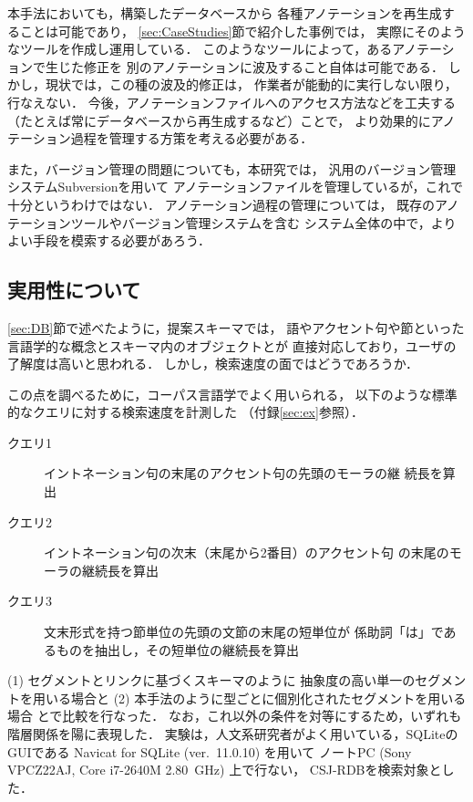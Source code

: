 \documentclass[japanese]{jnlp_1.4}
\begin{document}
本手法においても，構築したデータベースから
各種アノテーションを再生成することは可能であり，
\ref{sec:CaseStudies}節で紹介した事例では，
実際にそのようなツールを作成し運用している．
このようなツールによって，あるアノテーションで生じた修正を
別のアノテーションに波及すること自体は可能である．
しかし，現状では，この種の波及的修正は，
作業者が能動的に実行しない限り，行なえない．
今後，アノテーションファイルへのアクセス方法などを工夫する
（たとえば常にデータベースから再生成するなど）ことで，
より効果的にアノテーション過程を管理する方策を考える必要がある．

また，バージョン管理の問題についても，本研究では，
汎用のバージョン管理システムSubversionを用いて
アノテーションファイルを管理しているが，これで十分というわけではない．
アノテーション過程の管理については，
既存のアノテーションツールやバージョン管理システムを含む
システム全体の中で，よりよい手段を模索する必要があろう．


\subsection{実用性について}

\ref{sec:DB}節で述べたように，提案スキーマでは，
語やアクセント句や節といった言語学的な概念とスキーマ内のオブジェクトとが
直接対応しており，ユーザの了解度は高いと思われる．
しかし，検索速度の面ではどうであろうか．

この点を調べるために，コーパス言語学でよく用いられる，
以下のような標準的なクエリに対する検索速度を計測した
（付録\ref{sec:ex}参照）．

\begin{description}
 \item[クエリ1] イントネーション句の末尾のアクセント句の先頭のモーラの継
続長を算出
 \item[クエリ2] イントネーション句の次末（末尾から2番目）のアクセント句
の末尾のモーラの継続長を算出
 \item[クエリ3] 文末形式を持つ節単位の先頭の文節の末尾の短単位が
係助詞「は」であるものを抽出し，その短単位の継続長を算出
\end{description}

(1) セグメントとリンクに基づくスキーマのように
抽象度の高い単一のセグメントを用いる場合と
(2) 本手法のように型ごとに個別化されたセグメントを用いる場合
とで比較を行なった．
なお，これ以外の条件を対等にするため，いずれも階層関係を陽に表現した．
実験は，人文系研究者がよく用いている，SQLiteのGUIである
Navicat for SQLite (ver.~11.0.10) を用いて
ノートPC (Sony VPCZ22AJ, Core i7-2640M 2.80~GHz) 上で行ない，
CSJ-RDBを検索対象とした．
\end{document}
